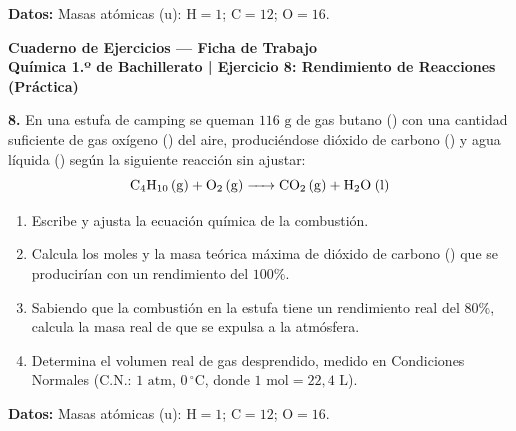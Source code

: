 ﻿\documentclass[11pt,a4paper]{article}
\begin{document}
\vspace{0.5cm}
\noindent\textbf{Datos:} Masas atómicas ($\text{u}$): $\mathrm{H} = 1$; $\mathrm{C} = 12$; $\mathrm{O} = 16$.

\newpage

\begin{center}
    {\LARGE \textbf{Cuaderno de Ejercicios — Ficha de Trabajo}}\\[4pt]
    {\large \textbf{Química 1.º de Bachillerato | Ejercicio 8: Rendimiento de Reacciones (Práctica)}}
\end{center}

\vspace{0.8cm}
\noindent\textbf{8.} En una estufa de camping se queman $116\text{ g}$ de gas butano () con una cantidad suficiente de gas oxígeno () del aire, produciéndose dióxido de carbono () y agua líquida () según la siguiente reacción sin ajustar:
\[
\ce{C4H10 (g) + O2 (g) -> CO2 (g) + H2O (l)}
\]

\begin{enumerate}[label=\textbf{\alph*)}, leftmargin=2em, itemsep=12pt]
    \item Escribe y ajusta la ecuación química de la combustión.
    \item Calcula los moles y la masa teórica máxima de dióxido de carbono () que se producirían con un rendimiento del $100\%$.
    \item Sabiendo que la combustión en la estufa tiene un rendimiento real del $80\%$, calcula la masa real de  que se expulsa a la atmósfera.
    \item Determina el volumen real de gas  desprendido, medido en Condiciones Normales ($\text{C.N.}$: $1\text{ atm}$, $0\,^\circ\text{C}$, donde $1\text{ mol} = 22{,}4\text{ L}$).
\end{enumerate}

\vspace{0.5cm}
\noindent\textbf{Datos:} Masas atómicas ($\text{u}$): $\mathrm{H} = 1$; $\mathrm{C} = 12$; $\mathrm{O} = 16$.
\end{document}
